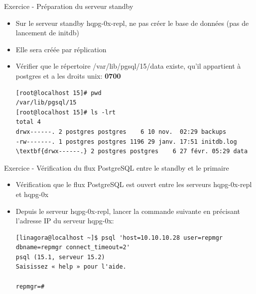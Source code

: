 
\begin{frame}[fragile]{Exercice - Préparation du serveur standby}

   \begin{itemize}
      \item Sur le serveur standby hqpg-0x-repl, ne pas créer le base de données (pas de lancement de initdb)
      \item Elle sera créée par réplication
      \item Vérifier que le répertoire /var/lib/pgsql/15/data existe, qu'il appartient à postgres et a les droits unix: \textbf{0700}
\begin{tiny}
\begin{Verbatim}[commandchars=\\\{\}]
[root@localhost 15]# pwd
/var/lib/pgsql/15
[root@localhost 15]# ls -lrt
total 4
drwx------. 2 postgres postgres    6 10 nov.  02:29 backups
-rw-------. 1 postgres postgres 1196 29 janv. 17:51 initdb.log
\textbf{drwx------.} 2 postgres postgres    6 27 févr. 05:29 data
\end{Verbatim}
\end{tiny}
   \end{itemize}

\end{frame}


\begin{frame}[fragile]{Exercice - Vérification du flux PostgreSQL entre le standby et le primaire}

   \begin{itemize}
      \item Vérification que le flux PostgreSQL est ouvert entre les serveurs hqpg-0x-repl et hqpg-0x
      \item Depuis le serveur hqpg-0x-repl, lancer la commande suivante en précisant l'adresse IP du serveur hqpg-0x:
\begin{tiny}
\begin{Verbatim}[commandchars=\\\{\}]
[linagora@localhost ~]$ psql 'host=10.10.10.28 user=repmgr dbname=repmgr connect_timeout=2'
psql (15.1, serveur 15.2)
Saisissez « help » pour l'aide.

repmgr=# 
\end{Verbatim}
\end{tiny}
   \end{itemize}

\end{frame}

